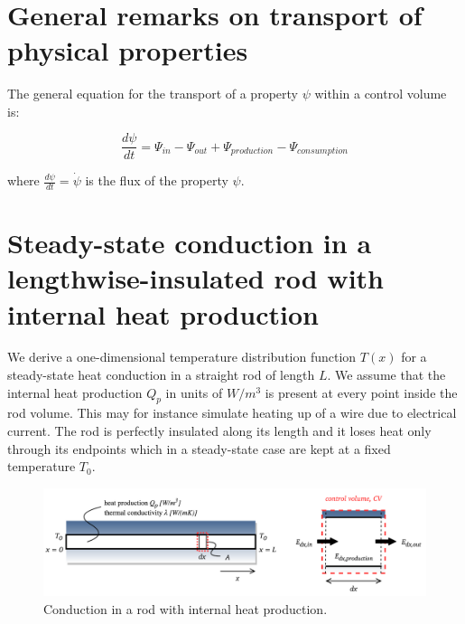 \documentclass[10pt]{article}
\begin{document}
\newpage

\tableofcontents

\newpage

\setlength{\parskip}{0.6em}
\setlength{\parindent}{0cm}


\,\,\,

\normalsize

\section{General remarks on transport of physical properties}

The general equation for the transport of a property $\psi$ within a control volume is:

\begin{equation}
\frac{d \psi}{dt} = \Psi_{in} - \Psi_{out} + \Psi_{production} - \Psi_{consumption}
\end{equation}

where $\frac{d \psi}{dt} = \dot{\psi}$ is the flux of the property $\psi$.

\newpage

\section{Steady-state conduction in a lengthwise-insulated rod with internal heat production}

We derive a one-dimensional temperature distribution function $T(x)$ for a steady-state heat conduction in a straight rod of length $L$. We assume that the internal heat production $Q_p$ in units of $W/m^3$ is present at every point inside the rod volume. This may for instance simulate heating up of a wire due to electrical current. The rod is perfectly insulated along its length and it loses heat only through its endpoints which in a steady-state case are kept at a fixed temperature $T_0$.

\begin{figure}[H]
\centering\includegraphics[width=16cm]{DWGs/cond-rod.png}
\caption{Conduction in a rod with internal heat production.}
\label{fig:conduction}
\end{figure}
\end{document}
